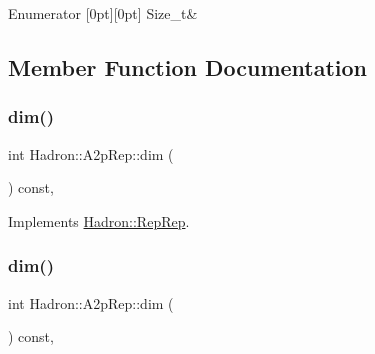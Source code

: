 \begin{DoxyEnumFields}{Enumerator}
[0pt][0pt]{}\mbox{\label{structHadron_1_1A2pRep_a1ae4e9923ef6202e0e822a5d6801630aa2d30d4dda9e31e92800d0753a2d9514a}} 
Size\+\_\+t&\\
\hline

\end{DoxyEnumFields}


\subsection{Member Function Documentation}
\mbox{\label{structHadron_1_1A2pRep_ad62519ad376b83f6d4c434d2f2a01825}} 
\subsubsection{\texorpdfstring{dim()}{dim()}\hspace{0.1cm}{\footnotesize\ttfamily [1/3]}}
{\footnotesize\ttfamily int Hadron\+::\+A2p\+Rep\+::dim (\begin{DoxyParamCaption}{ }\end{DoxyParamCaption}) const\hspace{0.3cm}{\ttfamily [inline]}, {\ttfamily [virtual]}}



Implements \mbox{\hyperlink{structHadron_1_1RepRep_a92c8802e5ed7afd7da43ccfd5b7cd92b}{Hadron\+::\+Rep\+Rep}}.

\mbox{\label{structHadron_1_1A2pRep_ad62519ad376b83f6d4c434d2f2a01825}} 
\subsubsection{\texorpdfstring{dim()}{dim()}\hspace{0.1cm}{\footnotesize\ttfamily [2/3]}}
{\footnotesize\ttfamily int Hadron\+::\+A2p\+Rep\+::dim (\begin{DoxyParamCaption}{ }\end{DoxyParamCaption}) const\hspace{0.3cm}{\ttfamily [inline]}, {\ttfamily [virtual]}}



